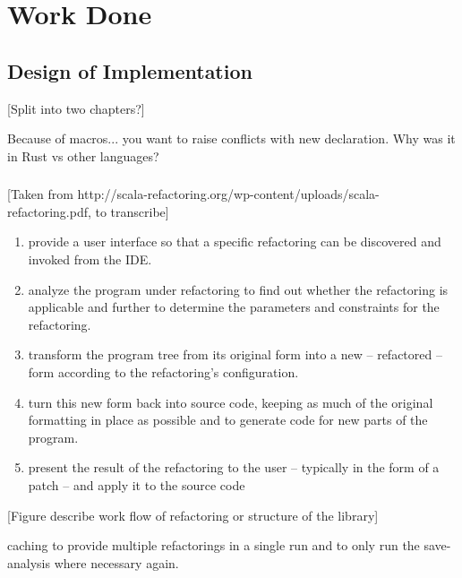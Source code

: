 \chapter{Work Done}\label{C:wd}

\section{Design of Implementation}




[Split into two chapters?]

Because of macros... you want to raise conflicts with new declaration.
Why was it in Rust vs other languages? 

\subsection{}
[Taken from http://scala-refactoring.org/wp-content/uploads/scala-refactoring.pdf, to transcribe]
\begin{enumerate}
\item provide a user interface so that a specific refactoring can be discovered and
invoked from the IDE.
\item analyze the program under refactoring to find out whether the refactoring is
applicable  and  further  to  determine  the  parameters  and  constraints  for  the
refactoring.
\item transform the program tree from its original form into a new – refactored – form
according to the refactoring’s configuration.
\item turn this new form back into source code,  keeping as much of the original
formatting in place as possible and to generate code for new parts of the program.
\item present the result of the refactoring to the user – typically in the form of a patch –
and apply it to the source code
\end{enumerate}

[Figure describe work flow of refactoring or structure of the library]

caching to provide multiple refactorings in a single run and to only run the save-analysis where necessary again. 

